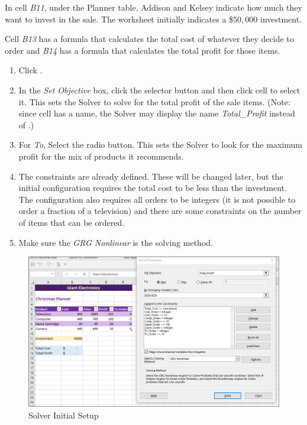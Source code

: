 In cell \textit{B11}, under the Planner table, Addison and Kelsey indicate how much they want to invest in the sale. The worksheet initially indicates a \$$ 50,000 $ investment.

Cell \textit{B13} has a formula that calculates the total cost of whatever they decide to order and \textit{B14} has a formula that calculates the total profit for those items.

\begin{enumerate}
	\item Click .
	\item In the \textit{Set Objective} box, click the selector button and then click cell  to select it. This sets the Solver to solve for the total profit of the sale items. (Note: since cell  has a name, the Solver may display 	the name \textit{Total\_Profit} instead of .)
	\item For \textit{To}, Select the  radio button. This sets the Solver to look for the maximum profit for the mix of products it recommends.
	\item The constraints are already defined. These will be changed later, but the initial configuration requires the total cost to be less than the investment. The configuration also requires all orders to be integers (it is not possible to order a fraction of a television) and there are some constraints on the number of items that can be ordered.
	\item Make sure the \textit{GRG Nonlinear} is the solving method.
\end{enumerate}

\begin{figure}[H]
	\centering
	\includegraphics[width=\maxwidth{.95\linewidth}]{gfx/ch08_fig81}
	\caption{Solver Initial Setup}
	\label{08:fig81}
\end{figure}

